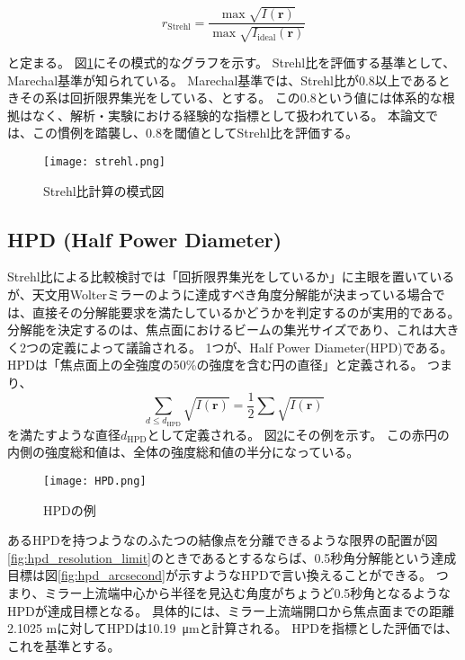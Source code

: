 \[
r_{\mathrm{Strehl}} = \frac{ \max{\sqrt{I(\mathbf{r})} } }{ \max{ \sqrt{I_{\mathrm{ideal}}( \mathbf{r} )} } }
\]

と定まる。
図\ref{fig:strehl_explanation}にその模式的なグラフを示す。
Strehl比を評価する基準として、Marechal基準\cite{BornWolf:1999:Book}が知られている。
Marechal基準では、Strehl比が0.8以上であるときその系は回折限界集光をしている、とする。
この0.8という値には体系的な根拠はなく、解析・実験における経験的な指標として扱われている。
本論文では、この慣例を踏襲し、0.8を閾値としてStrehl比を評価する。

\begin{figure}[h]
\centering
\texttt{[image: strehl.png]}
\caption{Strehl比計算の模式図}
\label{fig:strehl_explanation}
\end{figure}

\subsection{HPD (Half Power Diameter)}
\label{chap2_hpd}

Strehl比による比較検討では「回折限界集光をしているか」に主眼を置いているが、天文用Wolterミラーのように達成すべき角度分解能が決まっている場合では、直接その分解能要求を満たしているかどうかを判定するのが実用的である。
分解能を決定するのは、焦点面におけるビームの集光サイズであり、これは大きく2つの定義によって議論される。
1つが、Half Power Diameter(HPD)である。
HPDは「焦点面上の全強度の50\%の強度を含む円の直径」と定義される。
つまり、
\[
    \sum_{d\leq d_{\mathrm{HPD}}} \sqrt{ I(\mathbf{r}) } = \frac{1}{2} \sum \sqrt{ I(\mathbf{r}) }
\]
を満たすような直径$d_{\mathrm{HPD}}$として定義される。
図\ref{fig:hpd_explanation}にその例を示す。
この赤円の内側の強度総和値は、全体の強度総和値の半分になっている。

\begin{figure}[!ht]
\centering
\texttt{[image: HPD.png]}
\caption{HPDの例}
\label{fig:hpd_explanation}
\end{figure}

あるHPDを持つようなのふたつの結像点を分離できるような限界の配置が図\ref{fig:hpd_resolution_limit}のときであるとするならば、0.5秒角分解能という達成目標は図\ref{fig:hpd_arcsecond}が示すようなHPDで言い換えることができる。
つまり、ミラー上流端中心から半径を見込む角度がちょうど0.5秒角となるようなHPDが達成目標となる。
具体的には、ミラー上流端開口から焦点面までの距離2.1025 mに対してHPDは\SI{10.19}{\micro \metre}と計算される。
HPDを指標とした評価では、これを基準とする。

